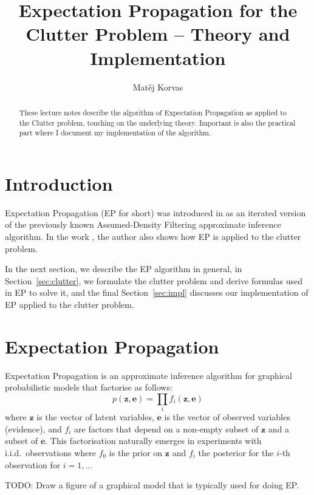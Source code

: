 \documentclass[11pt]{article}
\title{Expectation Propagation for the Clutter Problem -- Theory and 
Implementation}
\author{Matěj Korvas \\
}
\newcommand{\vek}[1]{\ensuremath{\mathbf{#1}}}
\begin{document}
\maketitle
\begin{abstract}
These lecture notes describe the algorithm of Expectation Propagation as 
applied to the Clutter problem, touching on the underlying theory.  
Important is also the practical part where I document my implementation of 
the algorithm.
\end{abstract}

\section{Introduction}

Expectation Propagation (EP for short) was introduced in 
\cite{minka_expectation_2001} as an iterated version of the previously 
known Assumed-Density Filtering approximate inference algorithm. In the 
work \cite{minka_expectation_2001}, the author also shows how EP is applied 
to the clutter problem.

In the next section, we describe the EP algorithm in general, in 
Section~\ref{sec:clutter}, we formulate the clutter problem and derive 
formulas used in EP to solve it, and the final Section~\ref{sec:impl} 
discusses our implementation of EP applied to the clutter problem.

\section{Expectation Propagation}

Expectation Propagation is an approximate inference algorithm for graphical 
probabilistic models that factorise as follows:
\begin{equation}
	p(\vek{z}, \vek{e}) = \prod_{i}{f_i(\vek{z}, \vek{e})}
	\label{eq:factorisation}
\end{equation}
where $\vek{z}$ is the vector of latent variables, $\vek{e}$ is the vector 
of observed variables (evidence), and $f_i$ are factors that depend on 
a non-empty subset of $\vek{z}$ and a subset of $\vek{e}$. This 
factorisation naturally emerges in experiments with i.i.d.\ observations 
where $f_0$ is the prior on $\vek{z}$ and $f_i$ the posterior for the 
$i$-th observation for $i = 1, \dots$

TODO: Draw a figure of a graphical model that is typically used for doing 
EP.
\end{document}

